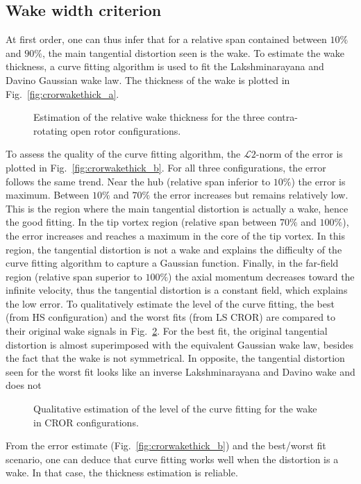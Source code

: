 \subsection{Wake width criterion}
At first order, one can thus infer that for a relative
span contained between $10\%$ and $90\%$, the main
tangential distortion seen is the wake. 
To estimate the wake thickness, a curve
fitting algorithm is used to fit the Lakshminarayana
and Davino Gaussian wake law. The thickness
of the wake is plotted in Fig.~\ref{fig:crorwakethick_a}.
\begin{figure}[htbp]
  \centering
  \caption{Estimation of the relative wake thickness for the three contra-rotating
  open rotor configurations.}
  \label{fig:crorwakethick}
\end{figure}
To assess the quality of the curve fitting
algorithm, the $\mathcal{L}2$-norm
of the error is plotted in Fig.~\ref{fig:crorwakethick_b}.
For all three configurations, the error follows the same trend.
Near the hub (relative span inferior to $10\%$) the error is
maximum. Between $10\%$ and $70\%$ the error increases but
remains relatively low. This is the region
where the main tangential distortion is
actually a wake, hence the good fitting. 
In the tip vortex region (relative
span between $70\%$ and $100\%$), the error increases
and reaches a maximum in the core of the tip vortex.
In this region, the tangential distortion is not a wake
and explains the difficulty of the curve fitting algorithm
to capture a Gaussian function.
Finally, in the far-field region (relative span superior to $100\%$)
the axial momentum decreases toward the infinite velocity, thus
the tangential distortion is a constant field, which explains
the low error.
To qualitatively estimate the level of the curve fitting,
the best (from \mockup HS configuration) and the
worst fits (from \mockup LS CROR) are compared to their
original wake signals in Fig.~\ref{fig:crorwakeestimate}.
For the best fit, the original tangential distortion is
almost superimposed with the equivalent Gaussian wake law, besides
the fact that the wake is not symmetrical. In opposite,
the tangential distortion seen for the worst fit looks like
an inverse Lakshminarayana and Davino wake and does not  
\begin{figure}[htbp]
  \centering
  \caption{Qualitative estimation of the level of the curve fitting for the
  wake in CROR configurations.}
  \label{fig:crorwakeestimate}
\end{figure}
From the error estimate (Fig.~\ref{fig:crorwakethick_b})
and the best/worst fit scenario, one can deduce that
curve fitting works well when the distortion is a wake.
In that case, the thickness estimation is reliable. 

